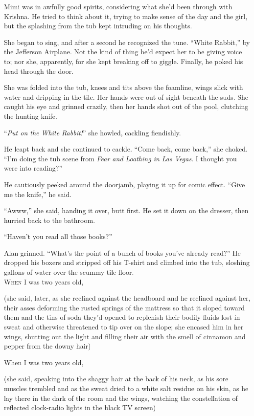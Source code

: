 \documentclass{article}
\begin{document}
Mimi was in awfully good spirits, considering what she'd been through
with Krishna.  He tried to think about it, trying to make sense of the
day and the girl, but the splashing from the tub kept intruding on his
thoughts.

She began to sing, and after a second he recognized the tune.  ``White
Rabbit,'' by the Jefferson Airplane.  Not the kind of thing he'd
expect her to be giving voice to; nor she, apparently, for she kept
breaking off to giggle.  Finally, he poked his head through the door.

She was folded into the tub, knees and tits above the foamline, wings
slick with water and dripping in the tile.  Her hands were out of
sight beneath the suds.  She caught his eye and grinned crazily, then
her hands shot out of the pool, clutching the hunting knife.

``\textit{Put on the White Rabbit!}'' she howled, cackling fiendishly.

He leapt back and she continued to cackle.  ``Come back, come back,''
she choked.  ``I'm doing the tub scene from \textit{Fear and Loathing
in Las Vegas}.  I thought you were into reading?''

He cautiously peeked around the doorjamb, playing it up for comic
effect.  ``Give me the knife,'' he said.

``Awww,'' she said, handing it over, butt first.  He set it down on
the dresser, then hurried back to the bathroom.

``Haven't you read all those books?''

Alan grinned.  ``What's the point of a bunch of books you've already
read?'' He dropped his boxers and stripped off his T-shirt and climbed
into the tub, sloshing gallons of water over the scummy tile floor.
\\
\lettrine[lines=3, lhang=.5, nindent=0pt, findent=2pt]{W}{hen} I was two years old,

(she said, later, as she reclined against the headboard and he
reclined against her, their asses deforming the rusted springs of the
mattress so that it sloped toward them and the tins of soda they'd
opened to replenish their bodily fluids lost in sweat and otherwise
threatened to tip over on the slope; she encased him in her wings,
shutting out the light and filling their air with the smell of
cinnamon and pepper from the downy hair)

When I was two years old,

(she said, speaking into the shaggy hair at the back of his neck, as
his sore muscles trembled and as the sweat dried to a white salt
residue on his skin, as he lay there in the dark of the room and the
wings, watching the constellation of reflected clock-radio lights in
the black TV screen)
\end{document}
